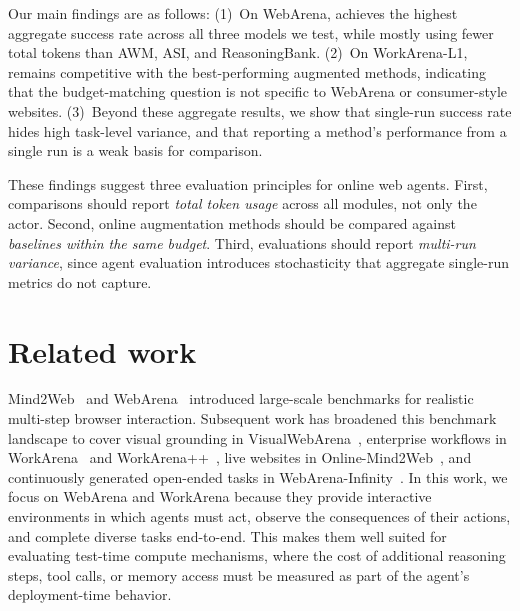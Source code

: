 Our main findings are as follows:
(1)~On WebArena, \budgetactor{} achieves the highest aggregate success rate across all three models we test, while mostly using fewer total tokens than AWM, ASI, and ReasoningBank.
(2)~On WorkArena-L1, \budgetactor{} remains competitive with the best-performing augmented methods, indicating that the budget-matching question is not specific to WebArena or consumer-style websites.
(3)~Beyond these aggregate results, we show that single-run success rate hides high task-level variance, and that reporting a method's performance from a single run is a weak basis for comparison.

These findings suggest three evaluation principles for online web agents. First, comparisons should report \emph{total token usage} across all modules, not only the actor.
Second, online augmentation methods should be compared against \emph{baselines within the same budget}.
Third, evaluations should report \emph{multi-run variance}, since agent evaluation introduces stochasticity that aggregate single-run metrics do not capture.

\section{Related work}

 Mind2Web~\citep{deng-etal-2024-mind2web} and WebArena~\citep{zhou-etal-2024-webarena} introduced large-scale benchmarks for realistic multi-step browser interaction. Subsequent work has broadened this benchmark landscape to cover visual grounding in VisualWebArena~\citep{koh-etal-2024-visualwebarena}, enterprise workflows in WorkArena~\citep{drouin-etal-2024-workarena} and WorkArena++~\citep{boisvert-etal-2024-workarenaplusplus}, live websites in Online-Mind2Web~\citep{xue-etal-2025-illusion}, and continuously generated open-ended tasks in WebArena-Infinity~\citep{webarena-infinity}. In this work, we focus on WebArena and WorkArena because they provide interactive environments in which agents must act, observe the consequences of their actions, and complete diverse tasks end-to-end. This makes them well suited for evaluating test-time compute mechanisms, where the cost of additional reasoning steps, tool calls, or memory access must be measured as part of the agent's deployment-time behavior.

